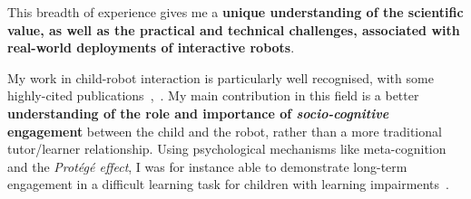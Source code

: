 This breadth of experience gives me a \textbf{unique understanding of the
scientific value, as well as the practical and technical challenges, associated
with real-world deployments of interactive robots}.


My work in child-robot interaction is particularly well recognised, with some
highly-cited publications~\autocite[presented below]{hood2015cowriter,
hood2015when, lemaignan2016learning},~\autocite{karim2015review,
kennedy2017child, jacq2016building}. My main contribution in this field is a
better \textbf{understanding of the role and importance of
\emph{socio-cognitive} engagement} between the child and the robot, rather than
a more traditional tutor/learner relationship. Using psychological mechanisms
like meta-cognition and the \emph{Protégé effect}, I was for instance able to
demonstrate long-term engagement in a difficult learning task for children with
learning impairments~\autocite{lemaignan2016learning}.




